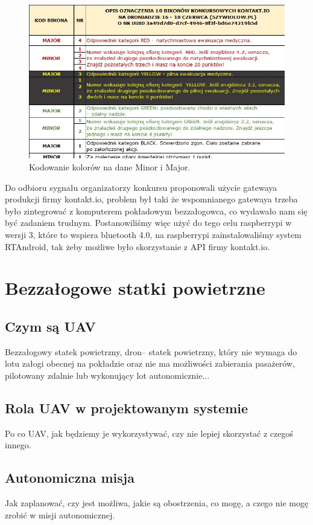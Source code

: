 \begin{figure}[!th]
    \centering
    \includegraphics[width=15cm]{zalaczniki/obrazy/opis-znaczenia-bikonow-konkursowych.jpg}
    \caption{Kodowanie kolorów na dane Minor i Major.}
    \label{fig:minormajor}
\end{figure}

Do odbioru sygnału organizatorzy konkursu proponowali użycie gatewaya produkcji firmy kontakt.io\cite{gateway}, problem był taki że wspomnianego gatewaya trzeba było zintegrować z komputerem pokładowym bezzałogowca, co wydawało nam się być zadaniem trudnym. Postanowiliśmy więc użyć do tego celu raspberrypi w wersji 3, które to wspiera bluetooth 4.0, na raspberrypi zainstalowaliśmy system RTAndroid\cite{rtandroid}, tak żeby możliwe było skorzystanie z API firmy kontakt.io.

\section{Bezzałogowe statki powietrzne}
\subsection{Czym są UAV}
Bezzałogowy statek powietrzny, dron– statek powietrzny, który nie wymaga do lotu załogi obecnej na pokładzie oraz nie ma możliwości zabierania pasażerów, pilotowany zdalnie lub wykonujący lot autonomicznie...
\subsection{Rola UAV w projektowanym systemie}
Po co UAV, jak będziemy je wykorzystywać, czy nie lepiej skorzystać z czegoś innego.
\subsection{Autonomiczna misja}
Jak zaplanować, czy jest możliwa, jakie są obostrzenia, co mogę, a czego nie mogę zrobić w misji autonomicznej.
